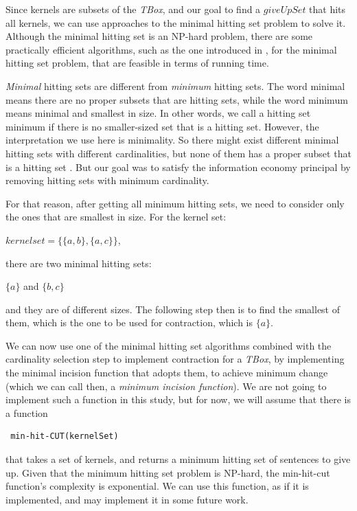 Since kernels are subsets of the \textit{TBox}, and our goal to find a $giveUpSet$ that hits all kernels, we can use approaches to the minimal hitting set problem to solve it. Although the minimal hitting set is an NP-hard problem, there are some practically efficient algorithms, such as the one introduced in \cite{hit}, for the minimal hitting set problem, that are feasible in terms of running time. 

\textit{Minimal} hitting sets are different from \textit{minimum} hitting sets. The word minimal means there are no proper subsets that are hitting sets, while the word minimum means minimal and smallest in size. In other words, we call a hitting set minimum if there is no smaller-sized set that is a hitting set. However, the interpretation we use here is minimality. So there might exist different minimal hitting sets with different cardinalities, but none of them has a proper subset that is a hitting set \cite{hit}. But our goal was to satisfy the information economy principal by removing hitting sets with minimum cardinality. 

For that reason, after getting all minimum hitting sets, we need to consider only the ones that are smallest in size. For the kernel set:
\begin{center}
$kernelset = \lbrace \lbrace a, b \rbrace , \lbrace a, c \rbrace \rbrace$,
\end{center}
there are two minimal hitting sets:
\begin{center}
$\lbrace a \rbrace$ \hspace{1cm} and \hspace{1cm} $\lbrace b, c \rbrace$
\end{center}
and they are of different sizes. The following step then is to find the smallest of them, which is the one to be used for contraction, which is $\lbrace a \rbrace$.

We can now use one of the minimal hitting set algorithms combined with the cardinality selection step to implement contraction for a \textit{TBox}, by implementing the minimal incision function that adopts them, to achieve minimum change (which we can call then, a \textit{minimum incision function}). We are not going to implement such a function in this study, but for now, we will assume that there is a function
\begin{verbatim}
 min-hit-CUT(kernelSet)
\end{verbatim}
that takes a set of kernels, and returns a minimum hitting set of sentences to give up. Given that the minimum hitting set problem is NP-hard, the min-hit-cut function's complexity is exponential. We can use this function, as if it is implemented, and may implement it in some future work.

